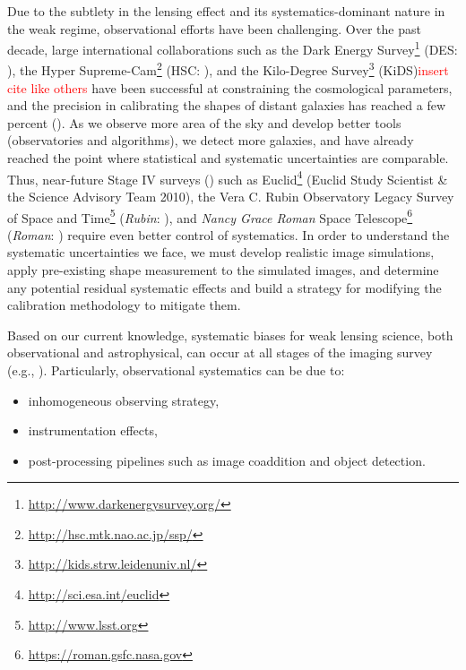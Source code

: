 \documentclass[fleqn,usenatbib]{mnras}
\begin{document}
Due to the subtlety in the lensing effect and its systematics-dominant nature in the weak regime, observational efforts have been challenging. Over the past decade, large international collaborations such as the Dark Energy Survey\footnote{\url{http://www.darkenergysurvey.org/}} (DES: \citealt{2005astro.ph.10346T}), the Hyper Supreme-Cam\footnote{\url{http://hsc.mtk.nao.ac.jp/ssp/}} (HSC: \citealt{2018PASJ...70S...4A}), and the Kilo-Degree Survey\footnote{\url{http://kids.strw.leidenuniv.nl/}} (KiDS)\textcolor{red}{insert cite like others} have been successful at constraining the cosmological parameters, and the precision in calibrating the shapes of distant galaxies has reached a few percent (\citealt{2020arXiv201103408G, 2020arXiv201208567M, 2021A&A...645A.105G}). As we observe more area of the sky and develop better tools (observatories and algorithms), we detect more galaxies, and have already reached the point where statistical and systematic uncertainties are comparable. Thus, near-future Stage IV surveys (\citealt{2006astro.ph..9591A}) such as Euclid\footnote{\url{ http://sci.esa.int/euclid}} (Euclid Study Scientist \& the Science Advisory Team 2010), the Vera C. Rubin Observatory Legacy Survey of Space and Time\footnote{\url{ http://www.lsst.org}} (\emph{Rubin}: \citealt{2009arXiv0912.0201L, 2019ApJ...873..111I}), and \emph{Nancy Grace Roman} Space Telescope\footnote{\url{https://roman.gsfc.nasa.gov}} (\emph{Roman}: \citealt{2015arXiv150303757S}) require even better control of systematics. In order to understand the systematic uncertainties we face, we must develop realistic image simulations, apply pre-existing shape measurement to the simulated images, and determine any potential residual systematic effects and build a strategy for modifying the calibration methodology to mitigate them.  


Based on our current knowledge, systematic biases for weak lensing science, both observational and astrophysical, can occur at all stages of the imaging survey (e.g., \citealt{2018ARA&A..56..393M}). Particularly, observational systematics can be due to: 
\begin{itemize}
    \item inhomogeneous observing strategy,
    \item instrumentation effects,
    \item post-processing pipelines such as image coaddition and object detection.
\end{itemize} 
\end{document}
